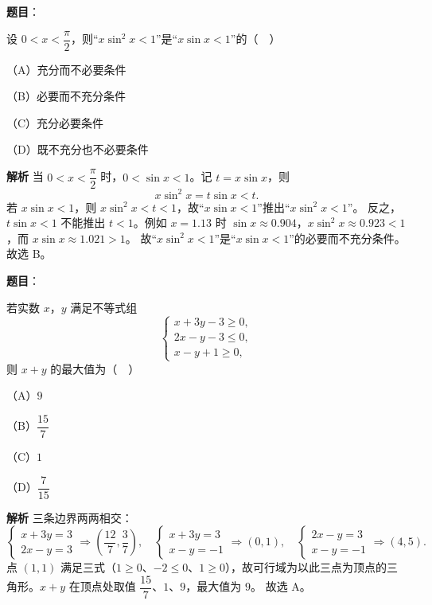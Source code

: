 \begin{answer}

\textbf{题目}：

设 $0<x<\dfrac{\pi}{2}$，则“$x\sin^2x<1$”是“$x\sin x<1$”的（　）

（A）充分而不必要条件

（B）必要而不充分条件

（C）充分必要条件

（D）既不充分也不必要条件

\textbf{解析}
当 $0<x<\dfrac\pi2$ 时，$0<\sin x<1$。记 $t=x\sin x$，则
\nopagebreak[4]
\[x\sin^2x=t\sin x<t.\]
若 $x\sin x<1$，则 $x\sin^2x<t<1$，故“$x\sin x<1$”推出“$x\sin^2x<1$”。
反之，$t\sin x<1$ 不能推出 $t<1$。例如 $x=1.13$ 时 $\sin x\approx0.904$，$x\sin^2x\approx0.923<1$，而 $x\sin x\approx1.021>1$。
故“$x\sin^2x<1$”是“$x\sin x<1$”的必要而不充分条件。
故选 B。


\end{answer}
\begin{answer}

\textbf{题目}：

若实数 $x$，$y$ 满足不等式组
\nopagebreak[4]
\[\begin{cases}
x+3y-3\geqslant 0,\\
2x-y-3\leqslant 0,\\
x-y+1\geqslant 0,
\end{cases}\]
则 $x+y$ 的最大值为（　）

（A）$9$

（B）$\dfrac{15}{7}$

（C）$1$

（D）$\dfrac{7}{15}$

\textbf{解析}
三条边界两两相交：
\nopagebreak[4]
\[\begin{cases}x+3y=3\\ 2x-y=3\end{cases}\Rightarrow\left(\frac{12}7,\frac37\right),\quad
\begin{cases}x+3y=3\\ x-y=-1\end{cases}\Rightarrow(0,1),\quad
\begin{cases}2x-y=3\\ x-y=-1\end{cases}\Rightarrow(4,5).\]
点 $(1,1)$ 满足三式（$1\geqslant0$、$-2\leqslant0$、$1\geqslant0$），故可行域为以此三点为顶点的三角形。$x+y$ 在顶点处取值 $\dfrac{15}7$、$1$、$9$，最大值为 $9$。
故选 A。


\end{answer}
